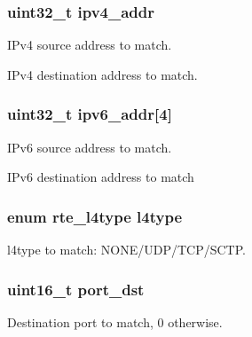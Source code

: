 \subsubsection[{ipv4\+\_\+addr}]{\setlength{\rightskip}{0pt plus 5cm}uint32\+\_\+t ipv4\+\_\+addr}\label{structrte__fdir__filter_a132e9dc13134d538f27e0d7fd09a7bc9}
I\+Pv4 source address to match.

I\+Pv4 destination address to match. \hypertarget{structrte__fdir__filter_a666af2f44468c2718d64b3e32bef3af6}{}
\subsubsection[{ipv6\+\_\+addr}]{\setlength{\rightskip}{0pt plus 5cm}uint32\+\_\+t ipv6\+\_\+addr\mbox{[}4\mbox{]}}\label{structrte__fdir__filter_a666af2f44468c2718d64b3e32bef3af6}
I\+Pv6 source address to match.

I\+Pv6 destination address to match \hypertarget{structrte__fdir__filter_a0d468c4d8e2f26e76d6a3b382714b111}{}
\subsubsection[{l4type}]{\setlength{\rightskip}{0pt plus 5cm}enum {\bf rte\+\_\+l4type} l4type}\label{structrte__fdir__filter_a0d468c4d8e2f26e76d6a3b382714b111}
l4type to match\+: N\+O\+N\+E/\+U\+D\+P/\+T\+C\+P/\+S\+C\+T\+P. \hypertarget{structrte__fdir__filter_aca5475783723cc06d0fb058080502033}{}
\subsubsection[{port\+\_\+dst}]{\setlength{\rightskip}{0pt plus 5cm}uint16\+\_\+t port\+\_\+dst}\label{structrte__fdir__filter_aca5475783723cc06d0fb058080502033}
Destination port to match, 0 otherwise. \hypertarget{structrte__fdir__filter_ab1b9c69e1aa78a6c57cacf6afd7c3bc9}{}
